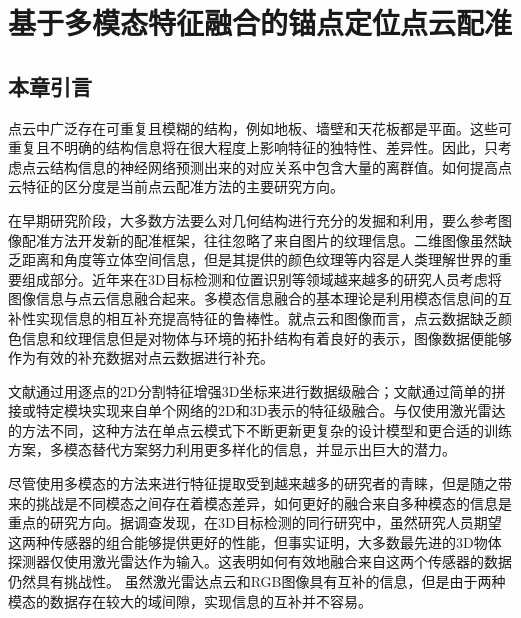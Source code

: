\chapter{基于多模态特征融合的锚点定位点云配准}
\thispagestyle{others}
\pagestyle{others}
\xiaosi

    \section{本章引言}
    点云中广泛存在可重复且模糊的结构，例如地板、墙壁和天花板都是平面。这些可重复且不明确的结构信息将在很大程度上影响特征的独特性、差异性。因此，只考虑点云结构信息的神经网络预测出来的对应关系中包含大量的离群值。如何提高点云特征的区分度是当前点云配准方法的主要研究方向。

    在早期研究阶段，大多数方法要么对几何结构进行充分的发掘和利用，要么参考图像配准方法开发新的配准框架，往往忽略了来自图片的纹理信息。二维图像虽然缺乏距离和角度等立体空间信息，但是其提供的颜色纹理等内容是人类理解世界的重要组成部分。近年来在3D目标检测和位置识别等领域越来越多的研究人员考虑将图像信息与点云信息融合起来。多模态信息融合的基本理论是利用模态信息间的互补性实现信息的相互补充提高特征的鲁棒性。就点云和图像而言，点云数据缺乏颜色信息和纹理信息但是对物体与环境的拓扑结构有着良好的表示，图像数据便能够作为有效的补充数据对点云数据进行补充。

    文献\cite{9156790, 7780605}通过用逐点的2D分割特征增强3D坐标来进行数据级融合；文献\cite{8100174, 8594049}通过简单的拼接或特定模块实现来自单个网络的2D和3D表示的特征级融合。与仅使用激光雷达的方法不同，这种方法在单点云模式下不断更新更复杂的设计模型和更合适的训练方案，多模态替代方案努力利用更多样化的信息，并显示出巨大的潜力。

    尽管使用多模态的方法来进行特征提取受到越来越多的研究者的青睐，但是随之带来的挑战是不同模态之间存在着模态差异，如何更好的融合来自多种模态的信息是重点的研究方向。据调查发现，在3D目标检测的同行研究中，虽然研究人员期望这两种传感器的组合能够提供更好的性能，但事实证明，大多数最先进的3D物体探测器仅使用激光雷达作为输入。这表明如何有效地融合来自这两个传感器的数据仍然具有挑战性。
    虽然激光雷达点云和RGB图像具有互补的信息，但是由于两种模态的数据存在较大的域间隙，实现信息的互补并不容易。

